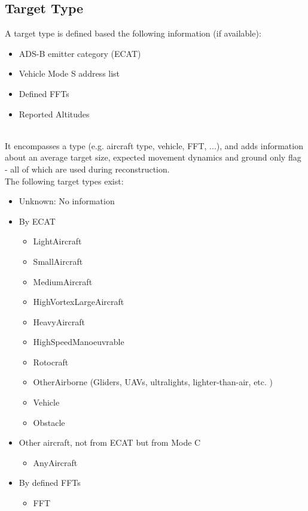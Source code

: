 \begin{itemize}
\subsection{Target Type}

A target type is defined based the following information (if available):

\begin{itemize}
\item ADS-B emitter category (ECAT)
\item Vehicle Mode S address list
\item Defined FFTs
\item Reported Altitudes
\end{itemize}

\ \\

It encompasses a type (e.g. aircraft type, vehicle, FFT, ...), and adds information about an average target size, expected movement dynamics and ground only flag - all of which are used during reconstruction. \\

The following target types exist:

\begin{itemize}
\item Unknown: No information
\item By ECAT
\begin{itemize}
\item LightAircraft
\item SmallAircraft
\item MediumAircraft
\item HighVortexLargeAircraft
\item HeavyAircraft
\item HighSpeedManoeuvrable
\item Rotocraft
\item OtherAirborne (Gliders, UAVs, ultralights, lighter-than-air, etc. )
\item Vehicle
\item Obstacle
\end{itemize}
\item Other aircraft, not from ECAT but from Mode C
\begin{itemize}
\item AnyAircraft
\end{itemize}
\item By defined FFTs
\begin{itemize}
\item FFT
\end{itemize}
\end{itemize}
\ \\


\end{itemize}
